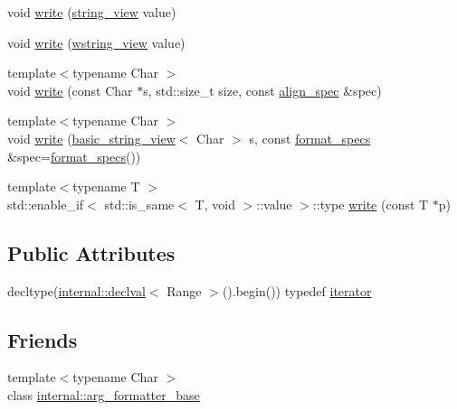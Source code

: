 \begin{DoxyCompactItemize}
\item 
void \hyperlink{classbasic__writer_a9145dbe901036b8f1a35587faac5e74e}{write} (\hyperlink{core_8h_a17e3ff7f9ac2b8f068f719b829890036}{string\+\_\+view} value)
\item 
void \hyperlink{classbasic__writer_ac6bb2fa0a1325a20d4288b66378fb4dd}{write} (\hyperlink{core_8h_ad7c259380697a46ef799332f3ded429e}{wstring\+\_\+view} value)
\item 
{\footnotesize template$<$typename Char $>$ }\\void \hyperlink{classbasic__writer_ab3396f1d61f77e4a3c2e12062f206a5c}{write} (const Char $\ast$s, std\+::size\+\_\+t size, const \hyperlink{structalign__spec}{align\+\_\+spec} \&spec)
\item 
{\footnotesize template$<$typename Char $>$ }\\void \hyperlink{classbasic__writer_a616e9e28d4395a215f7844b983c6bee5}{write} (\hyperlink{classbasic__string__view}{basic\+\_\+string\+\_\+view}$<$ Char $>$ s, const \hyperlink{classbasic__writer_ad0e2925cf7d02e0ccb6da44c06d64e55}{format\+\_\+specs} \&spec=\hyperlink{classbasic__writer_ad0e2925cf7d02e0ccb6da44c06d64e55}{format\+\_\+specs}())
\item 
{\footnotesize template$<$typename T $>$ }\\std\+::enable\+\_\+if$<$ std\+::is\+\_\+same$<$ T, void $>$\+::value $>$\+::type \hyperlink{classbasic__writer_ae8492113422d70a65c845000e9f964a0}{write} (const T $\ast$p)
\end{DoxyCompactItemize}
\subsection*{Public Attributes}
\begin{DoxyCompactItemize}
\item 
decltype(\hyperlink{namespaceinternal_a5f61aadb1d6afc8b79ef7ea57c39eafc}{internal\+::declval}$<$ Range $>$().begin()) typedef \hyperlink{classbasic__writer_a8e2b191740ebdbd67284ff5d5647ff62}{iterator}
\end{DoxyCompactItemize}
\subsection*{Friends}
\begin{DoxyCompactItemize}
\item 
{\footnotesize template$<$typename Char $>$ }\\class \hyperlink{classbasic__writer_a12c04f5659906e93c2418a4eb6358bd2}{internal\+::arg\+\_\+formatter\+\_\+base}
\end{DoxyCompactItemize}


